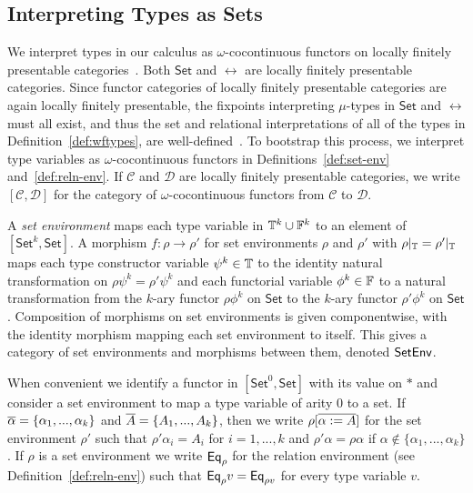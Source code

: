 \documentclass{lmcs}
\theoremstyle{plain}\newtheorem{satz}[thm]{Satz}
\newcommand{\set}{\mathsf{Set}}
\newcommand{\C}{\mathcal{C}}
\newcommand{\D}{\mathcal{D}}
\begin{document}
\subsection{Interpreting Types as Sets}\label{sec:set-interp}

We interpret types in our calculus as $\omega$-cocontinuous functors
on locally finitely presentable categories~\cite{ar94}. Both $\set$
and $\rel$ are locally finitely presentable categories. Since functor
categories of locally finitely presentable categories are again
locally finitely presentable, the fixpoints interpreting $\mu$-types
in $\set$ and $\rel$ must all exist, and thus the set and relational
interpretations of all of the types in Definition~\ref{def:wftypes},
are well-defined~\cite{jp19}. To bootstrap this process, we interpret
type variables as $\omega$-cocontinuous functors in
Definitions~\ref{def:set-env} and~\ref{def:reln-env}. If $\C$ and $\D$
are locally finitely presentable categories, we write $[\C,\D]$ for
the category of $\omega$-cocontinuous functors from $\C$ to $\D$.

\begin{defi}\label{def:set-env}
A {\em set environment} maps each type variable in $\mathbb{T}^k \cup
\mathbb{F}^k$ to an element of $[\set^k,\set]$.  A morphism $f : \rho \to
\rho'$ for set environments $\rho$ and $\rho'$ with $\rho|_{\mathbb{T}} =
\rho'|_{\mathbb{T}}$ maps each type constructor variable $\psi^k \in \mathbb{T}$
to the identity natural transformation on $\rho \psi^k = \rho'\psi^k$
and each functorial variable $\phi^k \in \mathbb{F}$ to a natural
transformation from the $k$-ary functor $\rho \phi^k$ on $\set$ to the
$k$-ary functor $\rho' \phi^k$ on $\set$.  Composition of morphisms on
set environments is given componentwise, with the identity morphism
mapping each set environment to itself. This gives a category of set
environments and morphisms between them, denoted $\mathsf{SetEnv}$.
\end{defi}
When convenient we identify a functor in $[\set^0, \set]$ with its
value on $\ast$ and consider a set environment to map a type variable
of arity $0$ to a set.  If $\overline{\alpha} = \{\alpha_1,...,\alpha_k\}$
and $\overline{A} = \{A_1,...,A_k\}$, then we write $\rho[\overline{\alpha := A}]$
for the set environment $\rho'$ such that $\rho' \alpha_i = A_i$ for
$i = 1,...,k$ and $\rho' \alpha = \rho \alpha$ if $\alpha \not \in
\{\alpha_1,...,\alpha_k\}$.  If $\rho$ is a set environment we write
$\mathsf{Eq}_\rho$ for the relation environment (see
Definition~\ref{def:reln-env}) such that $\mathsf{Eq}_\rho v = \mathsf{Eq}_{\rho v}$
for every type variable $v$.
\end{document}
